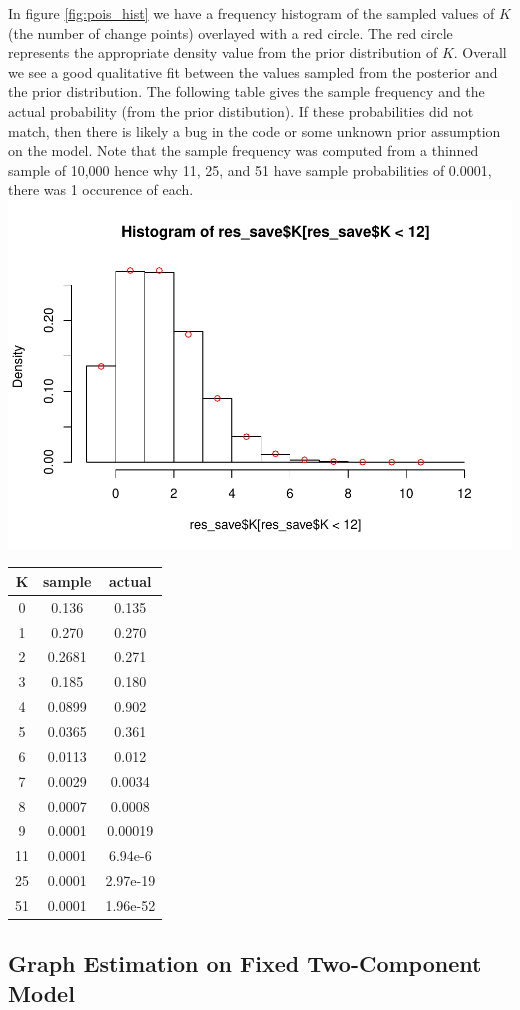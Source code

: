 \documentclass[11pt,a4paper]{article}
\numberwithin{equation}{section}
\begin{document}
In figure \ref{fig:pois_hist} we have a frequency histogram of the
sampled values of \(K\) (the number of change points) overlayed with a
red circle. The red circle represents the appropriate density value from
the prior distribution of \(K\). Overall we see a good qualitative fit
between the values sampled from the posterior and the prior
distribution. The following table gives the sample frequency and the
actual probability (from the prior distibution). If these probabilities
did not match, then there is likely a bug in the code or some unknown
prior assumption on the model. Note that the sample frequency was
computed from a thinned sample of 10,000 hence why 11, 25, and 51 have
sample probabilities of 0.0001, there was 1 occurence of each.
\includegraphics{thesis_draft_files/figure-latex/unnamed-chunk-6-1.pdf}

\begin{longtable}[]{@{}ccc@{}}
\toprule
K & sample & actual\tabularnewline
\midrule
\endhead
0 & 0.136 & 0.135\tabularnewline
1 & 0.270 & 0.270\tabularnewline
2 & 0.2681 & 0.271\tabularnewline
3 & 0.185 & 0.180\tabularnewline
4 & 0.0899 & 0.902\tabularnewline
5 & 0.0365 & 0.361\tabularnewline
6 & 0.0113 & 0.012\tabularnewline
7 & 0.0029 & 0.0034\tabularnewline
8 & 0.0007 & 0.0008\tabularnewline
9 & 0.0001 & 0.00019\tabularnewline
11 & 0.0001 & 6.94e-6\tabularnewline
25 & 0.0001 & 2.97e-19\tabularnewline
51 & 0.0001 & 1.96e-52\tabularnewline
\bottomrule
\end{longtable}

\hypertarget{graph-estimation-on-fixed-two-component-model}{%
\subsection{Graph Estimation on Fixed Two-Component
Model}\label{graph-estimation-on-fixed-two-component-model}}
\end{document}
